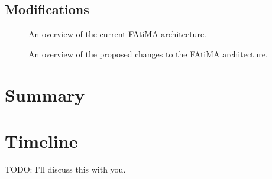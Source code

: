\documentclass{article}
\begin{document}
\subsection{Modifications}

\begin{figure}[h]
  \caption{An overview of the current FAtiMA architecture.} \label{fatima_diagram}
\end{figure}

\begin{figure}[h]
  \caption{An overview of the proposed changes to the FAtiMA architecture.} \label{fatima_diagram_modifications}
\end{figure}

\section{Summary}

\section{Timeline}

TODO: I'll discuss this with you.


{}
\end{document}
